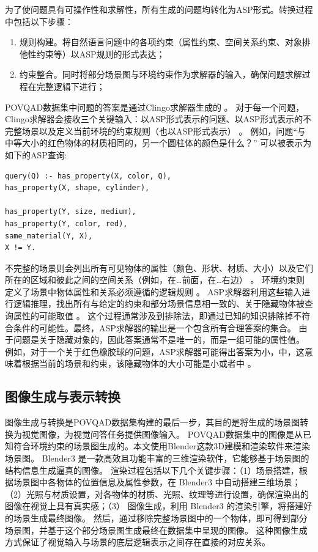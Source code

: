 为了使问题具有可操作性和求解性，所有生成的问题均转化为ASP形式。转换过程中包括以下步骤：
\begin{enumerate}
\item 规则构建。将自然语言问题中的各项约束（属性约束、空间关系约束、对象排他性约束等）以ASP规则的形式表达；
\item 约束整合。同时将部分场景图与环境约束作为求解器的输入，确保问题求解过程在完整逻辑下进行；
\end{enumerate}

POVQAD数据集中问题的答案是通过Clingo求解器生成的 。
对于每一个问题，Clingo求解器会接收三个关键输入：以ASP形式表示的问题、以ASP形式表示的不完整场景以及定义当前环境的约束规则（也以ASP形式表示） 。
例如，问题“与中等大小的红色物体的材质相同的，另一个圆柱体的颜色是什么？” 
可以被表示为如下的ASP查询:
\begin{lstlisting}
query(Q) :- has_property(X, color, Q),
has_property(X, shape, cylinder),

has_property(Y, size, medium),
has_property(Y, color, red),
same_material(Y, X),
X != Y.
\end{lstlisting}
不完整的场景则会列出所有可见物体的属性（颜色、形状、材质、大小）以及它们所在的区域和彼此之间的空间关系（例如，在…前面，在…右边） 。
环境约束则定义了场景中物体属性和关系必须遵循的逻辑规则 。
ASP求解器利用这些输入进行逻辑推理，找出所有与给定的约束和部分场景信息相一致的、关于隐藏物体被查询属性的可能取值 。
这个过程通常涉及到排除法，即通过已知的知识排除掉不符合条件的可能性。最终，ASP求解器的输出是一个包含所有合理答案的集合。
由于问题是关于隐藏对象的，因此答案通常不是唯一的，而是一组可能的属性值。
例如，对于一个关于红色橡胶球的问题，ASP求解器可能得出答案为{小，中}，这意味着根据当前的场景和约束，该隐藏物体的大小可能是小或者中 。
\subsection{图像生成与表示转换}
图像生成与转换是POVQAD数据集构建的最后一步，其目的是将生成的场景图转换为视觉图像，为视觉问答任务提供图像输入。
POVQAD数据集中的图像是从已知符合环境约束的场景图生成的。本文使用Blender这款3D建模和渲染软件来渲染场景图。
Blender3 是一款高效且功能丰富的三维渲染软件，它能够基于场景图的结构信息生成逼真的图像。
渲染过程包括以下几个关键步骤：（1）场景搭建，根据场景图中各物体的位置信息及属性参数，在 Blender3 中自动搭建三维场景；
（2）光照与材质设置，对各物体的材质、光照、纹理等进行设置，确保渲染出的图像在视觉上具有真实感；（3）
图像生成，利用 Blender3 的渲染引擎，将搭建好的场景生成最终图像。
然后，通过移除完整场景图中的一个物体，即可得到部分场景图，并基于这个部分场景图生成最终在数据集中呈现的图像。
这种图像生成方式保证了视觉输入与场景的底层逻辑表示之间存在直接的对应关系。

